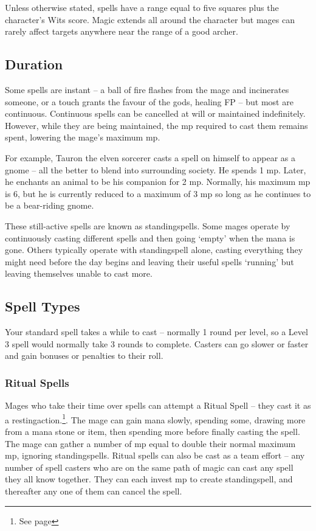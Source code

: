 \begin{multicols}{2}
Unless otherwise stated, spells have a range equal to five squares plus the character's Wits score. Magic extends all around the character but mages can rarely affect targets anywhere near the range of a good archer.

\subsection{Duration}

Some spells are instant -- a ball of fire flashes from the mage and incinerates someone, or a touch grants the favour of the gods, healing FP -- but most are continuous. Continuous spells can be cancelled at will or maintained indefinitely. However, while they are being maintained, the \gls{mp} required to cast them remains spent, lowering the mage's maximum \gls{mp}.

For example, Tauron the elven sorcerer casts a spell on himself to appear as a gnome -- all the better to blend into surrounding society. He spends 1 \gls{mp}. Later, he enchants an animal to be his companion for 2 \gls{mp}. Normally, his maximum \gls{mp} is 6, but he is currently reduced to a maximum of 3 \gls{mp} so long as he continues to be a bear-riding gnome.

These still-active spells are known as \glspl{standingspell}. Some mages operate by continuously casting different spells and then going `empty' when the mana is gone. Others typically operate with \gls{standingspell} alone, casting everything they might need before the day begins and leaving their useful spells `running' but leaving themselves unable to cast more.

\subsection{Spell Types}

Your standard spell takes a while to cast -- normally 1 \gls{round} per level, so a Level 3 spell would normally take 3 \glspl{round} to complete.  Casters can go slower or faster and gain bonuses or penalties to their roll.

\subsubsection{Ritual Spells}

Mages who take their time over spells can attempt a Ritual Spell -- they cast it as a \gls{restingaction}.\footnote{See page \pageref{restingactions}}.
The mage can gain mana slowly, spending some, drawing more from a mana stone or item, then spending more before finally casting the spell.
The mage can gather a number of \gls{mp} equal to double their normal maximum \gls{mp}, ignoring \glspl{standingspell}.
Ritual spells can also be cast as a team effort -- any number of spell casters who are on the same \gls{path} of magic can cast any spell they all know together.
They can each invest \gls{mp} to create \gls{standingspell}, and thereafter any one of them can cancel the spell.


\end{multicols}
